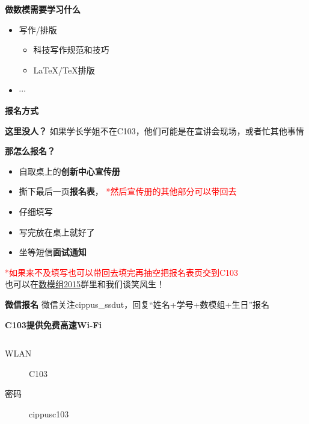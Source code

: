 \documentclass[presentation]{beamer}
\begin{document}
\begin{CJK*}{UTF8}{gbsn}
\begin{frame}{\textbf{做数模需要学习什么}}
\begin{itemize}
	\item 写作/排版
	\begin{itemize}
		\item 科技写作规范和技巧
		\item  \LaTeX/\TeX 排版
	\end{itemize}
	\item $\cdots$
	\end{itemize}
	
\end{frame}

\begin{frame}{\textbf{报名方式}}\label{signin}
	\begin{exampleblock}{\textbf{这里没人？}}
		如果学长学姐不在C103，他们可能是在宣讲会现场，或者忙其他事情
	\end{exampleblock}
	
	\begin{alertblock}{\textbf{那怎么报名？}}
		\begin{itemize}
			\item 自取桌上的\textbf{创新中心宣传册}
			\item 撕下最后一页\textbf{报名表}， \textcolor{red}{*然后宣传册的其他部分可以带回去}
			\item 仔细填写
			\item 写完放在桌上就好了
			\item 坐等短信\textbf{面试通知}
		\end{itemize}
		\textcolor{red}{*如果来不及填写也可以带回去填完再抽空把报名表页交到C103} \\
		也可以在\textcolor{blue}{\hyperlink{qun}{数模组2015}}群里和我们谈笑风生！
	\end{alertblock}
	
	\begin{block}{\textbf{微信报名}}
		微信关注cippus\_ssdut，回复“姓名+学号+数模组+生日”报名
	\end{block}
	
\end{frame}

\begin{frame}{\textbf{C103提供免费高速Wi-Fi}}
\begin{columns}
{\LARGE 
    \begin{description}
        \item[WLAN] C103
        \item[密码] cippusc103
    \end{description}
}
\end{columns}
\end{frame}


\end{CJK*}
\end{document}

